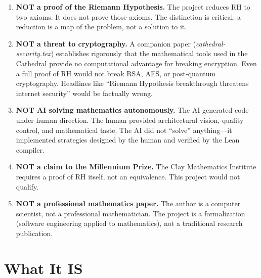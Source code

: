 \documentclass[11pt,a4paper]{article}
\begin{document}
\begin{enumerate}
  \item \textcolor{wrong}{\textbf{NOT a proof of the Riemann
    Hypothesis.}} The project reduces RH to two axioms. It does
    not prove those axioms. The distinction is critical: a
    reduction is a map of the problem, not a solution to it.

  \item \textcolor{wrong}{\textbf{NOT a threat to cryptography.}}
    A companion paper (\emph{cathedral-security.tex}) establishes
    rigorously that the mathematical tools used in the Cathedral
    provide no computational advantage for breaking encryption.
    Even a full proof of RH would not break RSA, AES, or
    post-quantum cryptography. Headlines like ``Riemann Hypothesis
    breakthrough threatens internet security'' would be factually
    wrong.

  \item \textcolor{wrong}{\textbf{NOT AI solving mathematics
    autonomously.}} The AI generated code under human direction.
    The human provided architectural vision, quality control, and
    mathematical taste. The AI did not ``solve'' anything---it
    implemented strategies designed by the human and verified by
    the Lean compiler.

  \item \textcolor{wrong}{\textbf{NOT a claim to the Millennium
    Prize.}} The Clay Mathematics Institute requires a proof of
    RH itself, not an equivalence. This project would not qualify.

  \item \textcolor{wrong}{\textbf{NOT a professional mathematics
    paper.}} The author is a computer scientist, not a
    professional mathematician. The project is a formalization
    (software engineering applied to mathematics), not a
    traditional research publication.
\end{enumerate}

\section{What It IS}
\end{document}
